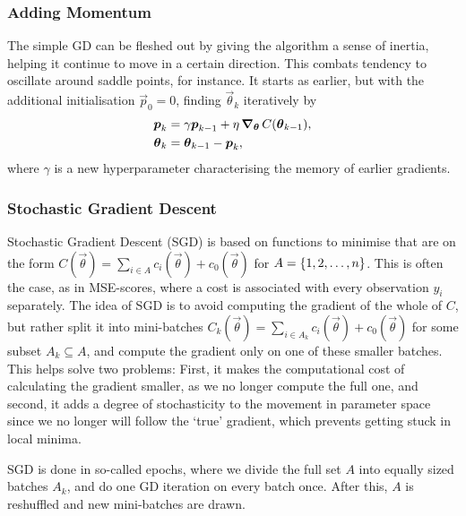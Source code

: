    \subsubsection{Adding Momentum}
        The simple GD can be fleshed out by giving the algorithm a sense of inertia, helping it continue to move in a certain direction. This combats tendency to oscillate around saddle points, for instance. It starts as earlier, but with the additional initialisation $\vec{p}_0 = 0$, finding $\vec{\theta}_k$ iteratively by 
        \begin{subequations}
            \begin{align}
                \boldsymbol{p}_{k} &= \gamma \boldsymbol{p}_{k-1} + \eta \operatorname{\operatorname{\boldsymbol{\nabla}}_{\boldsymbol{\theta}}} C(\boldsymbol{\theta}_{k-1}), \\
                \boldsymbol{\theta}_k &= \boldsymbol{\theta}_{k-1} - \boldsymbol{p}_k,
            \end{align}
        \end{subequations}
        where $\gamma$ is a new hyperparameter characterising the memory of earlier gradients.

    \subsubsection{Stochastic Gradient Descent} 
        Stochastic Gradient Descent (SGD) is based on functions to minimise that are on the form $C(\vec{\theta}) = \sum_{i \in A} c_i(\vec{\theta}) + c_0(\vec{\theta})$ for $A=\left\{1,2,\ldots,n\right\}$. This is often the case, as in MSE-scores, where a cost is associated with every observation $y_i$ separately. The idea of SGD is to avoid computing the gradient of the whole of $C$, but rather split it into mini-batches $C_k(\vec{\theta}) = \sum_{i\in A_k} c_i(\vec{\theta}) + c_0(\vec{\theta})$ for some subset $A_k \subseteq A$, and compute the gradient only on one of these smaller batches. This helps solve two problems: First, it makes the computational cost of calculating the gradient smaller, as we no longer compute the full one, and second, it adds a degree of stochasticity to the movement in parameter space since we no longer will follow the `true' gradient, which prevents getting stuck in local minima.

        SGD is done in so-called epochs, where we divide the full set $A$ into equally sized batches $A_k$, and do one GD iteration on every batch once. After this, $A$ is reshuffled and new mini-batches are drawn.

